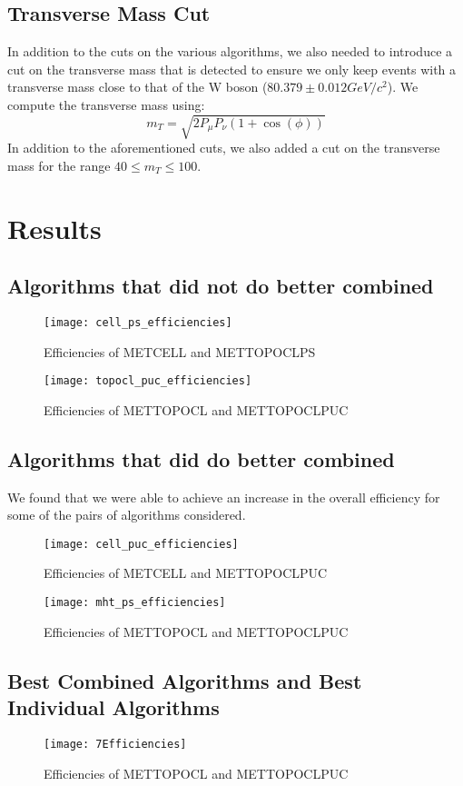 \subsection{Transverse Mass Cut}
In addition to the cuts on the various algorithms, we also needed to introduce a cut on the transverse mass that is detected to ensure we only keep events with a transverse mass close to that of the W boson ($80.379\pm 0.012 GeV/c^2$). 
We compute the transverse mass using:
$$m_{T}=\sqrt{2P_{\mu}P_{\nu}(1+\cos{(\phi)})}$$
In addition to the aforementioned cuts, we also added a cut on the transverse mass for the range $40 \leq m_{T} \leq 100$. 
\pagebreak
\section{Results}
\subsection{Algorithms that did not do better combined}
\begin{figure}[h]
        \centering
        \texttt{[image: cell\_ps\_efficiencies]}
        \caption{Efficiencies of METCELL and METTOPOCLPS}
\end{figure}
\begin{figure}[h]
        \centering
        \texttt{[image: topocl\_puc\_efficiencies]}
        \caption{Efficiencies of METTOPOCL and METTOPOCLPUC}
\end{figure}
\clearpage
\subsection{Algorithms that did do better combined}
We found that we were able to achieve an increase in the overall efficiency for some of the pairs of algorithms considered. 
\begin{figure}[h]
        \centering
        \texttt{[image: cell\_puc\_efficiencies]}
        \caption{Efficiencies of METCELL and METTOPOCLPUC}
\end{figure}
\begin{figure}[h]
        \centering
        \texttt{[image: mht\_ps\_efficiencies]}
        \caption{Efficiencies of METTOPOCL and METTOPOCLPUC}
\end{figure}
\clearpage
\subsection{Best Combined Algorithms and Best Individual Algorithms}
\begin{figure}[h]
        \centering
        \texttt{[image: 7Efficiencies]}
        \caption{Efficiencies of METTOPOCL and METTOPOCLPUC}
\end{figure}
\clearpage
